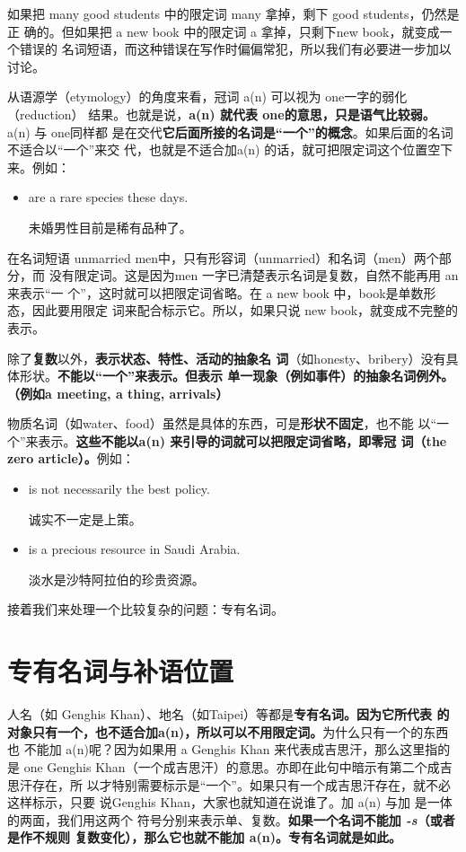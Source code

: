 如果把 many good students 中的限定词 many 拿掉，剩下 good students，仍然是正
确的。但如果把 a new book 中的限定词 a 拿掉，只剩下new book，就变成一个错误的
名词短语，而这种错误在写作时偏偏常犯，所以我们有必要进一步加以讨论。

从语源学（etymology）的角度来看，冠词 a(n) 可以视为 one一字的弱化（reduction）
结果。也就是说，\textbf{a(n) 就代表 one的意思，只是语气比较弱。} a(n) 与 one同样都
是在交代\textbf{它后面所接的名词是“一个”的概念}。如果后面的名词不适合以“一个”来交
代，也就是不适合加a(n) 的话，就可把限定词这个位置空下来。例如：
\begin{itemize}
\item {} are a rare species these days.

  未婚男性目前是稀有品种了。
\end{itemize}

在名词短语 unmarried men中，只有形容词（unmarried）和名词（men）两个部分，而
没有限定词。这是因为men 一字已清楚表示名词是复数，自然不能再用 an来表示“一
个”，这时就可以把限定词省略。在 a new book 中，book是单数形态，因此要用限定
词来配合标示它。所以，如果只说 new book，就变成不完整的表示。

除了\textbf{复数}以外，\textbf{表示状态、特性、活动的抽象名
  词}（如honesty、bribery）没有具体形状。\textbf{不能以“一个”来表示。但表示
  单一现象（例如事件）的抽象名词例外。（例如a meeting, a thing, arrivals）}

物质名词（如water、food）虽然是具体的东西，可是\textbf{形状不固定}，也不能
以“一个”来表示。\textbf{这些不能以a(n) 来引导的词就可以把限定词省略，即零冠
  词（the zero article）。}例如：

\begin{itemize}
\item  {} is not necessarily the best policy.

  诚实不一定是上策。

\item  {} is a precious resource in Saudi Arabia.

  淡水是沙特阿拉伯的珍贵资源。
\end{itemize}

接着我们来处理一个比较复杂的问题：专有名词。

\section{专有名词与补语位置}

人名（如 Genghis Khan）、地名（如Taipei）等都是\textbf{专有名词。因为它所代表
  的对象只有一个，也不适合加a(n)，所以可以不用限定词。}为什么只有一个的东西也
不能加 a(n)呢？因为如果用 a Genghis Khan 来代表成吉思汗，那么这里指的是 one
Genghis Khan（一个成吉思汗）的意思。亦即在此句中暗示有第二个成吉思汗存在，所
以才特别需要标示是“一个”。如果只有一个成吉思汗存在，就不必这样标示，只要
说Genghis Khan，大家也就知道在说谁了。加 a(n) 与加 是一体的两面，我们用这两个
符号分别来表示单、复数。\textbf{如果一个名词不能加 \emph{-s}（或者是作不规则
  复数变化），那么它也就不能加 a(n)。专有名词就是如此。}

